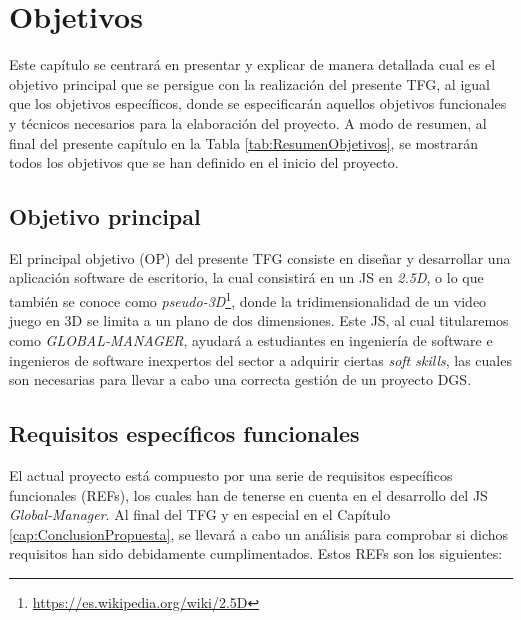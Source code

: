 \chapter{Objetivos}
\label{cap:Objetivo}

Este capítulo se centrará en presentar y explicar de manera detallada cual es el objetivo principal que se persigue con la realización del presente TFG, al igual que los objetivos específicos, donde se especificarán aquellos objetivos funcionales y técnicos necesarios para la elaboración del proyecto. A modo de resumen, al final del presente capítulo en la Tabla \ref{tab:ResumenObjetivos}, se mostrarán todos los objetivos que se han definido en el inicio del proyecto.

\section{Objetivo principal}
\label{sec:ObjetivoP}

El principal objetivo (OP) del presente TFG consiste en diseñar y desarrollar una aplicación software de escritorio, la cual consistirá en un JS en \emph{2.5D}, o lo que también se conoce como \emph{pseudo-3D}\footnote{\url{https://es.wikipedia.org/wiki/2.5D}}, donde la tridimensionalidad de un video juego en 3D se limita a un plano de dos dimensiones. Este JS, al cual titularemos como \emph{GLOBAL-MANAGER}, ayudará a estudiantes en ingeniería de software e ingenieros de software inexpertos del sector a adquirir ciertas \emph{soft skills}, las cuales son necesarias para llevar a cabo una correcta gestión de un proyecto DGS.

\section{Requisitos específicos funcionales}
\label{sec:ObjetivosF}

El actual proyecto está compuesto por una serie de requisitos específicos funcionales (REFs), los cuales han de tenerse en cuenta en el desarrollo del JS \emph{Global-Manager}. Al final del TFG y en especial en el Capítulo \ref{cap:ConclusionPropuesta}, se llevará a cabo un análisis para comprobar si dichos requisitos han sido debidamente cumplimentados. Estos REFs son los siguientes:

